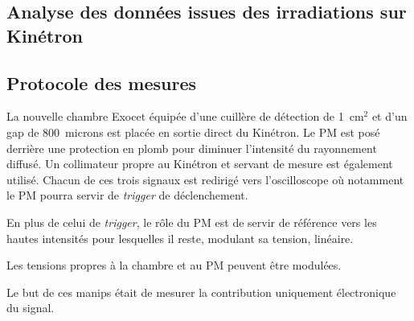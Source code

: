 \documentclass[a4paper,11pt]{article}
\begin{document}
\setmarginsrb{3.5cm}{1.5cm}{1.5cm}{2cm}{2ex}{3ex}{2ex}{5ex}
%
\lhead[]{}
\fancyfoot[C]{}
\fancyfoot[R]{\thepage}

\begin{center}
\subsection*{Analyse des données issues des irradiations sur Kinétron}
\end{center}

\subsection*{Protocole des mesures}
La nouvelle chambre Exocet équipée d'une cuillère de détection de 1~cm$^2$ et d'un gap de 800~microns  est placée en sortie direct du Kinétron.
Le PM est posé derrière une protection en plomb pour diminuer l'intensité du rayonnement diffusé.
Un collimateur propre au Kinétron et servant de mesure est également utilisé.
Chacun de ces trois signaux est redirigé vers l'oscilloscope où notamment le PM pourra servir de \emph{trigger} de déclenchement.

En plus de celui de \emph{trigger}, le rôle du PM est de servir de référence vers les hautes intensités pour lesquelles il reste, modulant sa tension, linéaire.

Les tensions propres à la chambre et au PM peuvent être modulées.

Le but de ces manips était de mesurer la contribution uniquement électronique du signal.

\newpage
\end{document}

